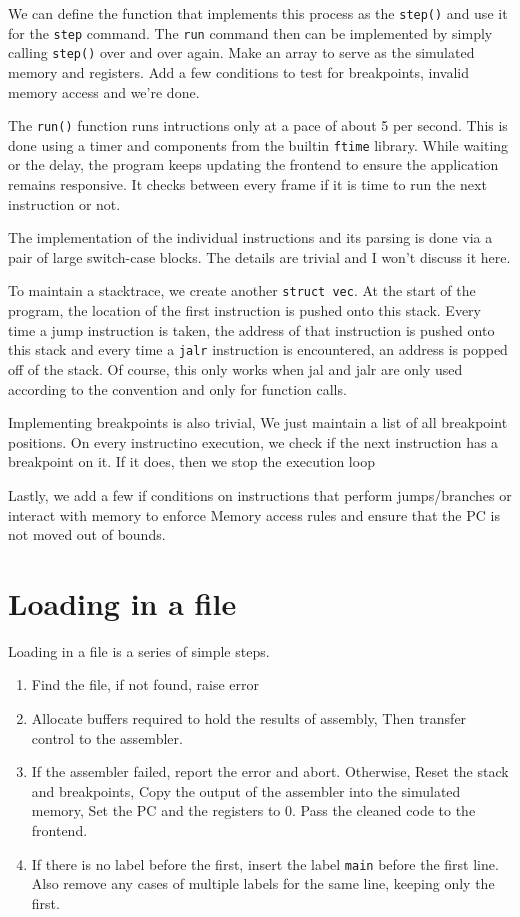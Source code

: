 \documentclass[12pt]{article}
\begin{document}
	We can define the function that implements this process as the \verb|step()| and use it for the \verb|step| command. The \verb|run| command then can be implemented by simply calling \verb|step()| over and over again. Make an array to serve as the simulated memory and registers. Add a few conditions to test for breakpoints, invalid memory access and we're done.

	The \verb|run()| function runs intructions only at a pace of about 5 per second. This is done using a timer and components from the builtin \verb|ftime| library. While waiting or the delay, the program keeps updating the frontend to ensure the application remains responsive. It checks between every frame if it is time to run the next instruction or not.

	The implementation of the individual instructions and its parsing is done via a pair of large switch-case blocks. The details are trivial and I won't discuss it here.

	To maintain a stacktrace, we create another \verb|struct vec|. At the start of the program, the location of the first instruction is pushed onto this stack.
	Every time a jump instruction is taken, the address of that instruction is pushed onto this stack and every time a \verb|jalr| instruction is encountered, an address is popped off of the stack. Of course, this only works when jal and jalr are only used according to the convention and only for function calls.

	Implementing breakpoints is also trivial, We just maintain a list of all breakpoint positions. On every instructino execution, we check if the next instruction has a breakpoint on it. If it does, then we stop the execution loop

	Lastly, we add a few if conditions on instructions that perform jumps/branches or interact with memory to enforce Memory access rules and ensure that the PC is not moved out of bounds.

	\section{Loading in a file}

	Loading in a file is a series of simple steps.
	
	\begin{enumerate}
		\item Find the file, if not found, raise error
		
		\item Allocate buffers required to hold the results of assembly, Then transfer control to the assembler.
		
		\item If the assembler failed, report the error and abort. Otherwise, Reset the stack and breakpoints, Copy the output of the assembler into the simulated memory, Set the PC and the registers to 0. Pass the cleaned code to the frontend.
		
		\item If there is no label before the first, insert the label \verb|main| before the first line. Also remove any cases of multiple labels for the same line, keeping only the first.
	\end{enumerate}
\end{document}

